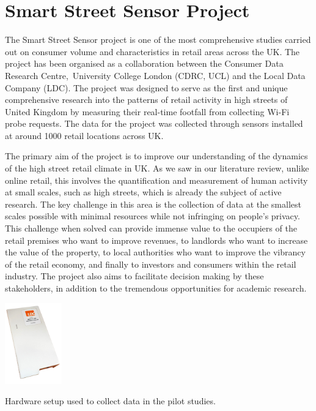 \section{Smart Street Sensor Project}
The Smart Street Sensor project is one of the most comprehensive studies carried out on consumer volume and characteristics in retail areas across the UK.
The project has been organised as a collaboration between the Consumer Data Research Centre, University College London (CDRC, UCL) and the Local Data Company (LDC).
The project was designed to serve as the first and unique comprehensive research into the patterns of retail activity in high streets of United Kingdom by measuring their real-time footfall from collecting Wi-Fi probe requests.
The data for the project was collected through sensors installed at around 1000 retail locations across UK.

The primary aim of the project is to improve our understanding of the dynamics of the high street retail climate in UK.
As we saw in our literature review, unlike online retail, this involves the quantification and measurement of human activity at small scales, such as high streets, which is already the subject of active research.
The key challenge in this area is the collection of data at the smallest scales possible with minimal resources while not infringing on people’s privacy.
This challenge when solved can provide immense value to the occupiers of the retail premises who want to improve revenues, to landlords who want to increase the value of the property, to local authorities who want to improve the vibrancy of the retail economy, and finally to investors and consumers within the retail industry.
The project also aims to facilitate decision making by these stakeholders, in addition to the tremendous opportunities for academic research.

\begin{marginfigure}[-2cm]
  \centering
  \includegraphics[height=3.5cm]{images/sss-hardware.jpg}
  \caption{Hardware setup used to collect data in the pilot studies.}
  \label{figure:collection:sss:hardware}
\end{marginfigure}

